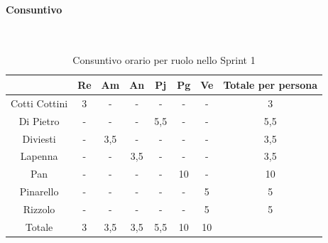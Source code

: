 \documentclass{article}
\begin{document}
                \paragraph{Consuntivo}\mbox{}\\
                \begin{table}[H]
                    \centering
                    \begin{tabular}{|c|c|c|c|c|c|c|c|}
                    \hline
                                  & Re  & Am  & An  & Pj  & Pg  & Ve  & Totale per persona \\ \hline
                    Cotti Cottini & 3   & -   & -   & -   & -   & -   & 3                  \\ \hline
                    Di Pietro     & -   & -   & -   & 5,5 & -   & -   & 5,5                \\ \hline
                    Diviesti      & -   & 3,5 & -   & -   & -   & -   & 3,5                \\ \hline
                    Lapenna       & -   & -   & 3,5 & -   & -   & -   & 3,5                \\ \hline
                    Pan           & -   & -   & -   & -   & 10  & -   & 10                 \\ \hline
                    Pinarello     & -   & -   & -   & -   & -   & 5   & 5                  \\ \hline
                    Rizzolo       & -   & -   & -   & -   & -   & 5   & 5                  \\ \hline
                    Totale        & 3   & 3,5 & 3,5 & 5,5 & 10  & 10  &                    \\ \hline
                    \end{tabular}
                    \caption{Consuntivo orario per ruolo nello Sprint 1}
                \end{table}

\end{document}
